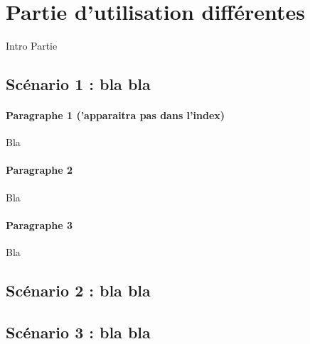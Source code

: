 \section{Partie d'utilisation différentes}

Intro
Partie

\subsection{Scénario 1 : bla bla }

\paragraph*{Paragraphe 1 ('apparaitra pas dans l'index)} Bla

\paragraph*{Paragraphe 2} Bla

\paragraph*{Paragraphe 3} Bla

\newpage

\subsection{Scénario 2 : bla bla }


\subsection{Scénario 3 : bla bla }

